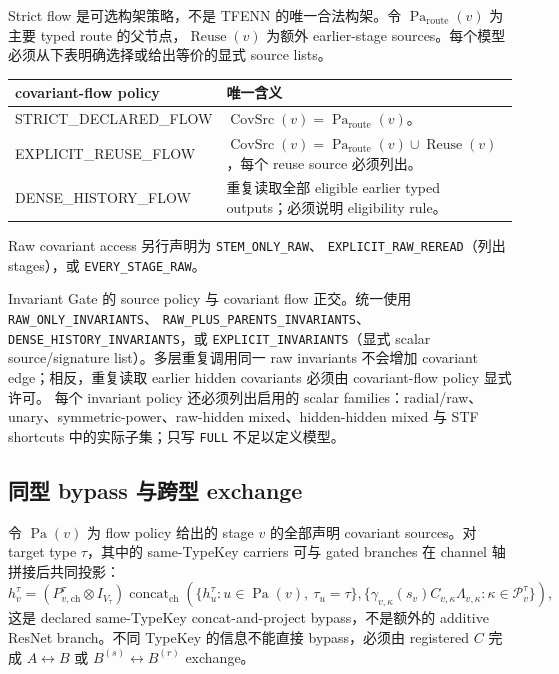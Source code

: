 \documentclass[11pt,a4paper,fontset=fandol]{ctexart}
\begin{document}
Strict flow 是可选构架策略，不是 TFENN 的唯一合法构架。令 $\operatorname{Pa}_{\mathrm{route}}(v)$ 为主要 typed route 的父节点，$\operatorname{Reuse}(v)$ 为额外 earlier-stage sources。每个模型必须从下表明确选择或给出等价的显式 source lists。

\begin{center}
\small
\begin{tabularx}{\linewidth}{>{\ttfamily\raggedright\arraybackslash}p{.31\linewidth}X}
\toprule
covariant-flow policy & 唯一含义 \\
\midrule
STRICT\_DECLARED\_FLOW
& $\operatorname{CovSrc}(v)=\operatorname{Pa}_{\mathrm{route}}(v)$。\\
EXPLICIT\_REUSE\_FLOW
& $\operatorname{CovSrc}(v)=\operatorname{Pa}_{\mathrm{route}}(v)\cup\operatorname{Reuse}(v)$，每个 reuse source 必须列出。\\
DENSE\_HISTORY\_FLOW
& 重复读取全部 eligible earlier typed outputs；必须说明 eligibility rule。\\
\bottomrule
\end{tabularx}
\end{center}

Raw covariant access 另行声明为
\texttt{STEM\_ONLY\_RAW}、
\texttt{EXPLICIT\_RAW\_REREAD}（列出 stages），或
\texttt{EVERY\_STAGE\_RAW}。

Invariant Gate 的 source policy 与 covariant flow 正交。统一使用
\texttt{RAW\_ONLY\_INVARIANTS}、
\texttt{RAW\_PLUS\_PARENTS\_INVARIANTS}、
\texttt{DENSE\_HISTORY\_INVARIANTS}，或
\texttt{EXPLICIT\_INVARIANTS}（显式 scalar source/signature list）。多层重复调用同一 raw invariants 不会增加 covariant edge；相反，重复读取 earlier hidden covariants 必须由 covariant-flow policy 显式许可。
每个 invariant policy 还必须列出启用的 scalar families：radial/raw、unary、symmetric-power、raw-hidden mixed、hidden-hidden mixed 与 STF shortcuts 中的实际子集；只写 \texttt{FULL} 不足以定义模型。

\subsection{同型 bypass 与跨型 exchange}

令 $\operatorname{Pa}(v)$ 为 flow policy 给出的 stage $v$ 的全部声明 covariant sources。对 target type $\tau$，其中的 same-TypeKey carriers 可与 gated branches 在 channel 轴拼接后共同投影：
\begin{equation}
  h_v^\tau
  =
  (P_{v,\mathrm{ch}}^\tau\otimes I_{V_\tau})
  \operatorname{concat}_{\mathrm{ch}}\!\left(
    \{h_u^\tau:u\in\operatorname{Pa}(v),\ \tau_u=\tau\},
    \{\gamma_{v,\kappa}(s_v)C_{v,\kappa}\Lambda_{v,\kappa}:\kappa\in\mathcal P_v^\tau\}
  \right),
  \label{eq:typed-bypass}
\end{equation}
这是 declared same-TypeKey concat-and-project bypass，不是额外的 additive ResNet branch。不同 TypeKey 的信息不能直接 bypass，必须由 registered $C$ 完成 $A\leftrightarrow B$ 或 $B^{(s)}\leftrightarrow B^{(r)}$ exchange。
\end{document}
